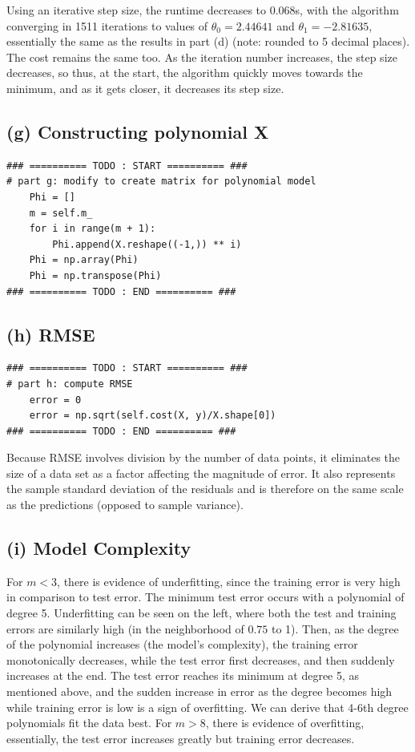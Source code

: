 \documentclass[11pt]{article}
\newcommand{\sol}[1]{{\bf{\color{magenta}{{Solution:}}}}}
\begin{document}
Using an iterative step size, the runtime decreases to $0.068$s, with the algorithm converging in 1511 iterations to values of $\theta_{0}=2.44641$ and $\theta_{1}=-2.81635$, essentially the same as the results in part (d) (note: rounded to 5 decimal places). The cost remains the same too. As the iteration number increases, the step size decreases, so thus, at the start, the algorithm quickly moves towards the minimum, and as it gets closer, it decreases its step size.

\subsection{(g) Constructing polynomial X}
\sol x
\begin{lstlisting}
### ========== TODO : START ========== ###
# part g: modify to create matrix for polynomial model
    Phi = []
    m = self.m_
    for i in range(m + 1):
        Phi.append(X.reshape((-1,)) ** i)
    Phi = np.array(Phi)
    Phi = np.transpose(Phi)
### ========== TODO : END ========== ###
\end{lstlisting}

\subsection{(h) RMSE}
\sol x
\begin{lstlisting}
### ========== TODO : START ========== ###
# part h: compute RMSE
    error = 0
    error = np.sqrt(self.cost(X, y)/X.shape[0])
### ========== TODO : END ========== ###
\end{lstlisting}

Because RMSE involves division by the number of data points, it eliminates the size of a data set as a factor affecting the magnitude of error. It also represents the sample standard deviation of the residuals and is therefore on the same scale as the predictions (opposed to sample variance). 

\subsection{(i) Model Complexity}
\sol x

For $m < 3$, there is evidence of underfitting, since the training error is very high in comparison to test error. The minimum test error occurs with a polynomial of degree 5. Underfitting can be seen on the left, where both the test and training errors are similarly high (in the neighborhood of $0.75$ to 1). Then, as the degree of the polynomial increases (the model's complexity), the training error monotonically decreases, while the test error first decreases, and then suddenly increases at the end. The test error reaches its minimum at degree 5, as mentioned above, and the sudden increase in error as the degree becomes high while training error is low is a sign of overfitting. We can derive that 4-6th degree polynomials fit the data best. For $m > 8$, there is evidence of overfitting, essentially, the test error increases greatly but training error decreases.
\end{document}

